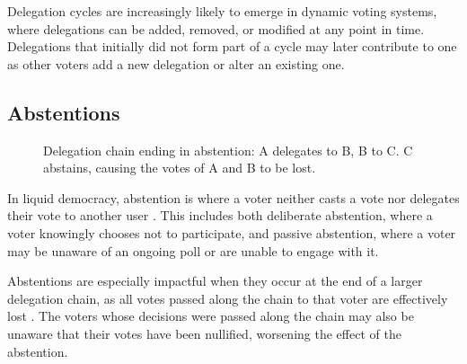 Delegation cycles are increasingly likely to emerge in dynamic voting systems, where delegations can be added, removed, or modified at any point in time. Delegations that initially did not form part of a cycle may later contribute to one as other voters add a new delegation or alter an existing one.
\subsection*{Abstentions}
\begin{figure}[h]
    \centering
    \caption{Delegation chain ending in abstention: A delegates to B, B to C. C abstains, causing the votes of A and B to be lost.}
    \label{fig:delegation-abstention}
\end{figure}

In liquid democracy, abstention is where a voter neither casts a vote nor delegates their vote to another user \citep{brill_liquid_2022}. This includes both deliberate abstention, where a voter knowingly chooses not to participate, and passive abstention, where a voter may be unaware of an ongoing poll or are unable to engage with it.

Abstentions are especially impactful when they occur at the end of a larger delegation chain, as all votes passed along the chain to that voter are effectively lost \citep{brill_liquid_2022}. The voters whose decisions were passed along the chain may also be unaware that their votes have been nullified, worsening the effect of the abstention.

